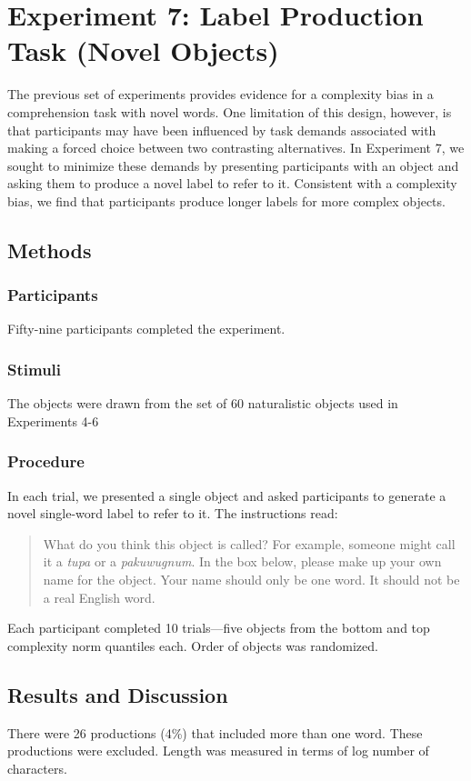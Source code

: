 \section{Experiment 7: Label Production Task (Novel Objects)}

The previous set of experiments provides evidence for a complexity bias in a comprehension task with novel words. One limitation of this design, however, is that participants may have been influenced by task demands associated with making a forced choice between two contrasting alternatives. In Experiment 7, we sought to minimize these demands by presenting participants with an object and asking them to produce a novel label to refer to it. Consistent with a complexity bias, we find that participants produce longer labels for more complex objects.

\subsection{Methods}
\subsubsection{Participants} Fifty-nine participants completed the experiment.
\subsubsection{Stimuli} The objects were drawn from the set of 60 naturalistic objects used in Experiments 4-6
\subsubsection{Procedure}
In each trial, we presented a single object and asked participants to generate a novel single-word label to refer to it. The instructions read:

\begin{quote}
What do you think this object is called? For example, someone might call it a {\it tupa} or a {\it pakuwugnum}. In the box below, please make up your own name for the object. Your name should only be one word. It should not be a real English word.
\end{quote}
Each participant completed 10 trials---five objects from the bottom and top complexity norm quantiles each. Order of objects was randomized.

\subsection{Results and Discussion}
There were 26 productions (4\%) that included more than one word. These productions were excluded. Length was measured in terms of log number of characters.

